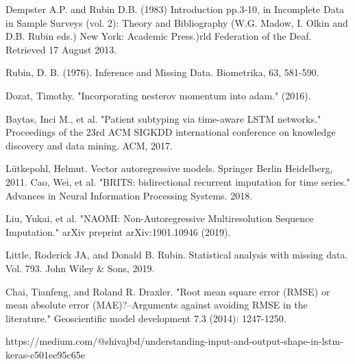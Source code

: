 \documentclass[11pt]{report}           %
\begin{document}





%


\appendix
%
%



\medskip



\begin{thebibliography}{80}



Dempster A.P. and Rubin D.B. (1983) Introduction pp.3-10, in Incomplete Data in Sample Surveys (vol. 2): Theory and Bibliography (W.G. Madow, I. Olkin and D.B. Rubin eds.) New York: Academic Press.)rld Federation of the Deaf. Retrieved 17 August 2013.
 
 Rubin, D. B. (1976). Inference and Missing Data. Biometrika, 63, 581-590. 

  Dozat, Timothy. "Incorporating nesterov momentum into adam." (2016).
 
 Baytas, Inci M., et al. "Patient subtyping via time-aware LSTM networks." Proceedings of the 23rd ACM SIGKDD international conference on knowledge discovery and data mining. ACM, 2017.
 
 Lütkepohl, Helmut. Vector autoregressive models. Springer Berlin Heidelberg, 2011.
 Cao, Wei, et al. "BRITS: bidirectional recurrent imputation for time series." Advances in Neural Information Processing Systems. 2018.
 
 Liu, Yukai, et al. "NAOMI: Non-Autoregressive Multiresolution Sequence Imputation." arXiv preprint arXiv:1901.10946 (2019).
 
 Little, Roderick JA, and Donald B. Rubin. Statistical analysis with missing data. Vol. 793. John Wiley & Sons, 2019.
 
 Chai, Tianfeng, and Roland R. Draxler. "Root mean square error (RMSE) or mean absolute error (MAE)?–Arguments against avoiding RMSE in the literature." Geoscientific model development 7.3 (2014): 1247-1250.
 
 https://medium.com/@shivajbd/understanding-input-and-output-shape-in-lstm-keras-c501ee95c65e
 

\end{thebibliography}
\end{document}

